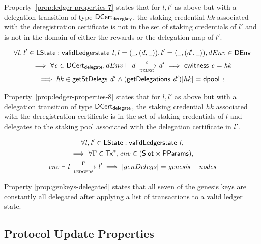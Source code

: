 Property~\ref{prop:ledger-properties-7} states that for $l, l'$ as above but
with a delegation transition of type $\mathsf{DCert_{deregkey}}$, the staking credential
$hk$ associated with the deregistration certificate is not in the set of staking
credentials of $l'$ and is not in the domain of either the rewards or the
delegation map of $l'$.

\begin{property}
  \begin{multline*}
    \forall \var{l}, \var{l'} \in \ledgerState: \applyFun{validLedgerstate}{l},
    l = (\wcard, (d,\wcard)), l' = (\wcard, (d',\wcard)), dEnv\in\DEnv \\
    \implies \forall \var{c} \in \DCertDeleg, dEnv \vdash\var{d}
    \trans{deleg}{c} \var{d'} \implies \applyFun{cwitness}{c} = \var{hk}\\
    \implies \var{hk} \in \applyFun{getStDelegs}{d'} \wedge
    (\applyFun{getDelegations}{d'})[hk] = \applyFun{dpool}{c}
  \end{multline*}
  \label{prop:ledger-properties-8}
\end{property}

Property~\ref{prop:ledger-properties-8} states that for $l, l'$ as above but
with a delegation transition of type $\mathsf{DCert_{delegate}}$, the staking credential $hk$
associated with the deregistration certificate is in the set of staking
credentials of $l$ and delegates to the staking pool associated with the
delegation certificate in $l'$.

\begin{property}
  \label{prop:genkeys-delegated}
  \begin{multline*}
    \forall \var{l}, \var{l'} \in \LState: \applyFun{validLedgerstate}{l},\\
    \implies \forall \Gamma \in \seqof{\Tx},
    \var{env} \in (\Slot \times \PParams), \\
    \var{env} \vdash\var{l} \trans{ledgers}{\Gamma} \var{l'} \implies |genDelegs| = \var{genesis-nodes}
  \end{multline*}
\end{property}

Property \ref{prop:genkeys-delegated} states that all seven of the genesis keys
are constantly all delegated after applying a list of transactions to a valid ledger
state.

\subsection{Protocol Update Properties}

